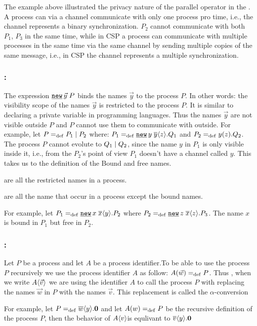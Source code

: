 The example above illustrated the privacy nature of the parallel operator in the \picalc{}. A process can via a channel communicate with only one process pro time, i.e., the channel represents a binary synchronization. $P_2$ cannot communicate with both $P_1$, $P_3$ in the same time, while in \gls{CSP} a process can communicate with multiple processes in the same time via the same channel by sending multiple copies of the same message, i.e., in CSP the channel represents a multiple synchronization.


\subsubsection{:}

The expression $\procres{\vec{y}}{P}$ binds the names $\vec{y}$ to the process $P$. In other words: the visibility scope of the  names $\vec{y}$ is restricted to the process $P$. It is similar to declaring a private variable in programming languages. Thus the names $\vec{y}$ are not visible outside $P$ and $P$ cannot use them to communicate with outside. For example, let $P=_{\mathrm{def}}P_1 \mid P_2$ where: $P_1\define\procres{y}{\out{y}{z}.Q_1}$ and $P_2=_{\mathrm{def}}y(z).Q_2$. The process $P$ cannot evolute to $Q_1 \mid Q_2$, since the name $y$ in $P_1$ is only visible inside it, i.e., from the $P_2$'s point of view $P_1$ doesn't have a channel called $y$. This takes us to the definition of the Bound and free names.

\begin{definition}
\label{def_bound_names}
 are all the restricted names in a process.
\end{definition}
\begin{definition}
\label{def_free_names}
 are all the name that occur in a process except the bound names.
\end{definition}

For example, let $P_1\define\procres{x}{\out{x}{y}.P_2}$ where $P_2\define\procres{z}{\out{x}{z}.P_3}$. The name $x$ is bound in $P_1$ but free in $P_2$.


\subsubsection{:}
\label{subsubsection_process_call}

Let $P$ be a process and let $A$ be a process identifier.To be able to use the process $P$ recursively we use the process identifier $A$ as follow: $A(\vec{w})=_{\mathrm{def}}{}P$. Thus , when we write $A\langle\vec{v}\rangle$ we are using the identifier $A$ to call the process $P$ with replacing the names $\vec{w}$ in $P$ with the names $\vec{v}$. This replacement is called the $\alpha$-conversion

For example, let $P=_{\mathrm{def}}\overline{w}\langle y\rangle.\mathbf{0}$ and let $A(w)=_{\mathrm{def}}{}P$ be the recursive definition of the process $P$, then the behavior of $A\langle v\rangle$is equlivant to $\overline{v}\langle y\rangle.\mathbf{0}$ 

